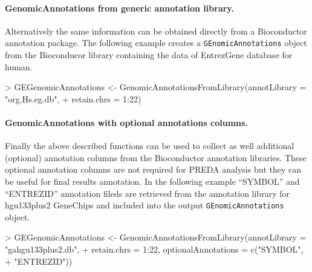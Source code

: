 \documentclass[a4paper,10pt]{article}
\begin{document}
\paragraph{GenomicAnnotations from generic annotation library.}
Alternatively the same information can be obtained directly from a Bioconductor annotation package. The following example creates a \texttt{GEnomicAnnotations} object from the Bioconducor library containing the data of EntrezGene database for human.
\begin{Schunk}
\begin{Sinput}
> GEGenomicAnnotations <- GenomicAnnotationsFromLibrary(annotLibrary = "org.Hs.eg.db", 
+     retain.chrs = 1:22)
\end{Sinput}
\end{Schunk}

\paragraph{GenomicAnnotations with optional annotations columns.} Finally the above described functions can be used to collect as well additional (optional) annotation columns from the Bioconductor annotation libraries. These optional annotation columns are not required for PREDA analysis but they can be useful for final results annotation. In the following example ``SYMBOL'' and ``ENTREZID'' annotation fileds are retrieved from the annotation library for hgu133plus2 GeneChips and included into the output \texttt{GEnomicAnnotations} object.

\begin{Schunk}
\begin{Sinput}
> GEGenomicAnnotations <- GenomicAnnotationsFromLibrary(annotLibrary = "gahgu133plus2.db", 
+     retain.chrs = 1:22, optionalAnnotations = c("SYMBOL", 
+         "ENTREZID"))
\end{Sinput}
\end{Schunk}
\end{document}

